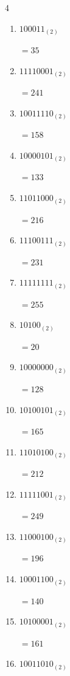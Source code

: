\begin{multicols}{4}
\begin{enumerate}
        $=108$

  \item $100011_{(2)}$

        $=35$

  \item $11110001_{(2)}$

        $=241$

  \item $10011110_{(2)}$

        $=158$

  \item $10000101_{(2)}$

        $=133$

  \item $11011000_{(2)}$

        $=216$

  \item $11100111_{(2)}$

        $=231$

\columnbreak %

  \item $11111111_{(2)}$

        $=255$

  \item $10100_{(2)}$

        $=20$

  \item $10000000_{(2)}$

        $=128$

  \item $10100101_{(2)}$

        $=165$

  \item $11010100_{(2)}$

        $=212$

  \item $11111001_{(2)}$

        $=249$

  \item $11000100_{(2)}$

        $=196$

  \item $10001100_{(2)}$

        $=140$

  \item $10100001_{(2)}$

        $=161$

  \item $10011010_{(2)}$


\end{enumerate}
\end{multicols}
